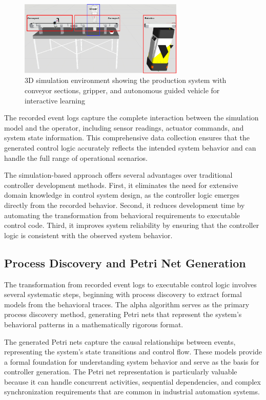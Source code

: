 \begin{figure}[h]
    \centering
    \includegraphics[width=0.7\textwidth]{MX_Papers/Paper6/images/simulation.png}
    \caption{3D simulation environment showing the production system with conveyor sections, gripper, and autonomous guided vehicle for interactive learning}
    \label{fig:simulation_environment}
\end{figure}

The recorded event logs capture the complete interaction between the simulation model and the operator, including sensor readings, actuator commands, and system state information. This comprehensive data collection ensures that the generated control logic accurately reflects the intended system behavior and can handle the full range of operational scenarios.

The simulation-based approach offers several advantages over traditional controller development methods. First, it eliminates the need for extensive domain knowledge in control system design, as the controller logic emerges directly from the recorded behavior. Second, it reduces development time by automating the transformation from behavioral requirements to executable control code. Third, it improves system reliability by ensuring that the controller logic is consistent with the observed system behavior.

\subsection{Process Discovery and Petri Net Generation}

The transformation from recorded event logs to executable control logic involves several systematic steps, beginning with process discovery to extract formal models from the behavioral traces. The alpha algorithm serves as the primary process discovery method, generating Petri nets that represent the system's behavioral patterns in a mathematically rigorous format.

The generated Petri nets capture the causal relationships between events, representing the system's state transitions and control flow. These models provide a formal foundation for understanding system behavior and serve as the basis for controller generation. The Petri net representation is particularly valuable because it can handle concurrent activities, sequential dependencies, and complex synchronization requirements that are common in industrial automation systems.

